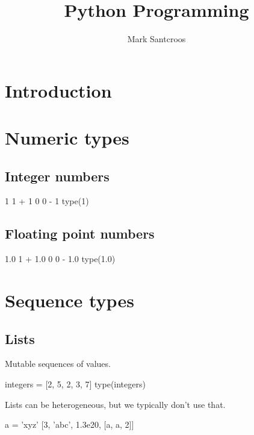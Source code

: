 \documentclass[aspectratio=1610,slidestop]{beamer}
\author{Mark Santcroos}
\title{Python Programming}
\begin{document}

\section{Introduction}

\section{Numeric types}
\subsection{Integer numbers}
\begin{pframe}
\begin{pyconsole}
1
1 + 1
0
0 - 1
type(1)
\end{pyconsole}

\end{pframe}

\subsection{Floating point numbers}
\begin{pframe}
\begin{pyconsole}
1.0
1 + 1.0
0
0 - 1.0
type(1.0)
\end{pyconsole}
\end{pframe}


\section{Sequence types}
\subsection{Lists}
\begin{pframe}
Mutable sequences of values.
\begin{pyconsole}
integers = [2, 5, 2, 3, 7]
type(integers)
\end{pyconsole}
\medskip
\medskip
Lists can be heterogeneous, but we typically don't use that.
\begin{pyconsole}
a = 'xyz'
[3, 'abc', 1.3e20, [a, a, 2]]
\end{pyconsole}
\end{pframe}
\end{document}

